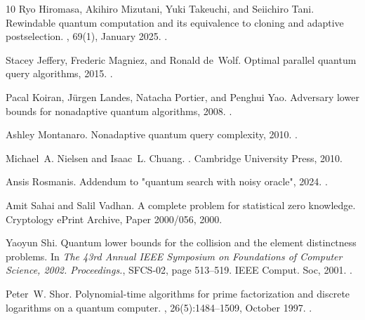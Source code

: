 \documentclass[10pt,a4paper]{article}
\begin{document}
\begin{thebibliography}{10}
Ryo Hiromasa, Akihiro Mizutani, Yuki Takeuchi, and Seiichiro Tani.
\newblock Rewindable quantum computation and its equivalence to cloning and adaptive postselection.
, 69(1), January 2025.
\newblock \href {https://doi.org/10.1007/s00224-024-10208-5} {}.

Stacey Jeffery, Frederic Magniez, and Ronald de~Wolf.
\newblock Optimal parallel quantum query algorithms, 2015.
\newblock \href {https://arxiv.org/abs/1309.6116} {}.

Pacal Koiran, Jürgen Landes, Natacha Portier, and Penghui Yao.
\newblock Adversary lower bounds for nonadaptive quantum algorithms, 2008.
\newblock \href {https://arxiv.org/abs/0804.1440} {}.

Ashley Montanaro.
\newblock Nonadaptive quantum query complexity, 2010.
\newblock \href {https://arxiv.org/abs/1001.0018} {}.

Michael~A. Nielsen and Isaac~L. Chuang.
.
\newblock Cambridge University Press, 2010.

Ansis Rosmanis.
\newblock Addendum to "quantum search with noisy oracle", 2024.
\newblock \href {https://arxiv.org/abs/2405.11973} {}.

Amit Sahai and Salil Vadhan.
\newblock A complete problem for statistical zero knowledge.
\newblock Cryptology {ePrint} Archive, Paper 2000/056, 2000.

Yaoyun Shi.
\newblock Quantum lower bounds for the collision and the element distinctness problems.
\newblock In {\em The 43rd Annual IEEE Symposium on Foundations of Computer Science, 2002. Proceedings.}, SFCS-02, page 513–519. IEEE Comput. Soc, 2001.
\newblock \href {https://doi.org/10.1109/sfcs.2002.1181975} {}.

Peter~W. Shor.
\newblock Polynomial-time algorithms for prime factorization and discrete logarithms on a quantum computer.
, 26(5):1484–1509, October 1997.
\newblock \href {https://doi.org/10.1137/s0097539795293172} {}.


\end{thebibliography}
\end{document}
